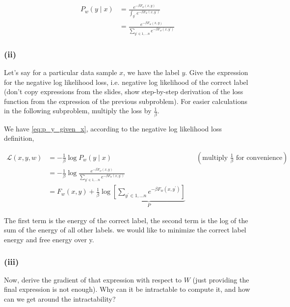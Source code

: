 \begin{align}
    P_{w}(y \mid x)
     & =\frac{e^{-\beta F_{w}(x, y)}}{\int_{y^{\prime}} e^{-\beta F_{w}\left(x, y^{\prime}\right)}} \\
     & =\frac{e^{-\beta F_{w}(x, y)}}
    {\sum_{y^{\prime} \in {1,...n}} e^{-\beta F_{w}\left(x, y^{\prime}\right)}}
\end{align}\label{eq:p_y_given_x}

\subsubsection*{(ii)}
Let's say for a particular data sample $x$, we have the label $y$. Give the expression for the negative log likelihood loss, i.e. negative log likelihood of the correct label (don't copy expressions from the slides, show step-by-step derivation of the loss function from the expression of the previous subproblem). For easier calculations in the following subproblem, multiply the loss by $\frac{1}{\beta}$.

We have \eqref{eq:p_y_given_x}, according to the negative log likelihood loss definition,

\begin{align}
    \mathcal{L}(x, y, w)
     & = -\frac{1}{\beta} \log P_{w}(y \mid x)                                                                                          &  & (\text{multiply $\frac{1}{\beta}$ for convenience}) \\
     & = -\frac{1}{\beta} \log \frac{e^{-\beta F_{w}(x, y)}}{\sum_{y^{\prime} \in {1,...n}} e^{-\beta F_{w}\left(x, y^{\prime}\right)}}                                                          \\
     & = F_{w}(x, y) +
    \frac{1}{\beta} \log
    \underbrace{
        \left[
            \sum_{y^{\prime} \in {1,...n}} e^{-\beta F_{w}\left(x, y^{\prime}\right)}
            \right]}_{P}
    \label{eq:loss}
\end{align}

The first term is the energy of the correct label, the second term is the log of the sum of the energy of all other labels. we would like to minimize the correct label energy and free energy over y.


\subsubsection*{(iii)}
Now, derive the gradient of that expression with respect to $W$ (just providing the final expression is not enough). Why can it be intractable to compute it, and how can we get around the intractability?


